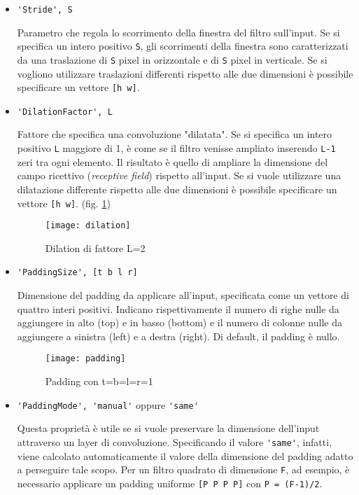 \begin{itemize}
	\item \verb|'Stride', S|
	
	Parametro che regola lo scorrimento della finestra del filtro sull'input. Se si specifica un intero positivo \verb|S|, gli scorrimenti della finestra sono caratterizzati da una traslazione di \verb|S| pixel in orizzontale e di \verb|S| pixel in verticale. Se si vogliono utilizzare traslazioni differenti rispetto alle due dimensioni è possibile specificare un vettore \verb|[h w]|.
	
	\item \verb|'DilationFactor', L|
	
	Fattore che specifica una convoluzione "dilatata". Se si specifica un intero positivo \verb|L| maggiore di 1, è come se il filtro venisse ampliato inserendo \verb|L-1| zeri tra ogni elemento. Il risultato è quello di ampliare la dimensione del campo ricettivo (\textit{receptive field}) rispetto all'input. Se si vuole utilizzare una dilatazione differente rispetto alle due dimensioni è possibile specificare un vettore \verb|[h w]|. (fig. \ref{fig:dilation})
	
\begin{figure}[h]
	\centering
	\texttt{[image: dilation]}
	\caption{Dilation di fattore L=2}
	\label{fig:dilation}
\end{figure}
	
	\item \verb|'PaddingSize', [t b l r]|
	
	Dimensione del padding da applicare all'input, specificata come un vettore di quattro interi positivi. Indicano rispettivamente il numero di righe nulle da aggiungere in alto (top) e in basso (bottom) e il numero di colonne nulle da aggiungere a sinistra (left) e a destra (right). Di default, il padding è nullo.
	
	\begin{figure}[h]
	\centering
	\texttt{[image: padding]}
	\caption{Padding con t=b=l=r=1}
	\label{fig:padding}
\end{figure}
	
	\item \verb|'PaddingMode', 'manual'| oppure \verb|'same'|
	
	Questa proprietà è utile se si vuole preservare la dimensione dell'input attraverso un layer di convoluzione. Specificando il valore \verb|'same'|, infatti, viene calcolato automaticamente il valore della dimensione del padding adatto a perseguire tale scopo. Per un filtro quadrato di dimensione \verb|F|, ad esempio, è necessario applicare un padding uniforme \verb|[P P P P]| con \verb|P = (F-1)/2|.
	

\end{itemize}
